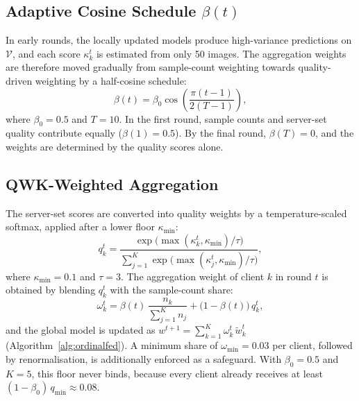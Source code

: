 
\subsection{Adaptive Cosine Schedule $\beta(t)$}
In early rounds, the locally updated models produce high-variance
predictions on $\mathcal{V}$, and each score $\kappa_k^t$ is estimated from
only 50 images. The aggregation weights are therefore moved gradually from
sample-count weighting towards quality-driven weighting by a half-cosine
schedule:
\begin{equation}
  \beta(t) = \beta_0 \cos\!\left(\frac{\pi (t-1)}{2(T-1)}\right),
  \label{eq:beta}
\end{equation}
where $\beta_0 = 0.5$ and $T = 10$. In the first round, sample counts and
server-set quality contribute equally ($\beta(1) = 0.5$). By the final
round, $\beta(T) = 0$, and the weights are determined by the quality scores
alone.

\subsection{QWK-Weighted Aggregation}
The server-set scores are converted into quality weights by a
temperature-scaled softmax, applied after a lower floor $\kappa_{\min}$:
\begin{equation}
  q_k^t = \frac{\exp\!\big(\max(\kappa_k^t, \kappa_{\min}) / \tau\big)}
               {\sum_{j=1}^{K} \exp\!\big(\max(\kappa_j^t, \kappa_{\min}) / \tau\big)},
  \label{eq:quality}
\end{equation}
where $\kappa_{\min} = 0.1$ and $\tau = 3$. The aggregation weight of client
$k$ in round $t$ is obtained by blending $q_k^t$ with the sample-count share:
\begin{equation}
  \omega_k^t = \beta(t)\,\frac{n_k}{\sum_{j=1}^{K} n_j}
             + \big(1 - \beta(t)\big)\, q_k^t ,
  \label{eq:weights}
\end{equation}
and the global model is updated as
$w^{t+1} = \sum_{k=1}^{K} \omega_k^t \, \tilde{w}_k^t$
(Algorithm~\ref{alg:ordinalfed}). A minimum share of $\omega_{\min} = 0.03$
per client, followed by renormalisation, is additionally enforced as a
safeguard. With $\beta_0 = 0.5$ and $K = 5$, this floor never binds, because
every client already receives at least $(1-\beta_0)\,q_{\min} \approx 0.08$.

